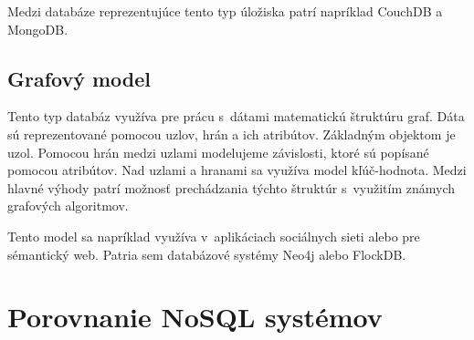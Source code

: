 \documentclass[11pt,twoside,a4paper]{book}
\begin{document}
Medzi databáze reprezentujúce tento typ úložiska patrí napríklad CouchDB a MongoDB.

\subsection{Grafový model}
Tento typ databáz využíva pre prácu s~dátami matematickú štruktúru graf. Dáta sú reprezentované pomocou uzlov, hrán a ich atribútov. Základným objektom je uzol. Pomocou hrán medzi uzlami modelujeme závislosti, ktoré sú popísané pomocou atribútov. Nad uzlami a hranami sa využíva model kľúč-hodnota. Medzi hlavné výhody patrí možnosť prechádzania týchto štruktúr s~využitím známych grafových algoritmov. 

Tento model sa napríklad využíva v~aplikáciach sociálnych sieti alebo pre sémantický web. Patria sem databázové systémy Neo4j alebo FlockDB.


\section{Porovnanie NoSQL systémov}


\end{document}
